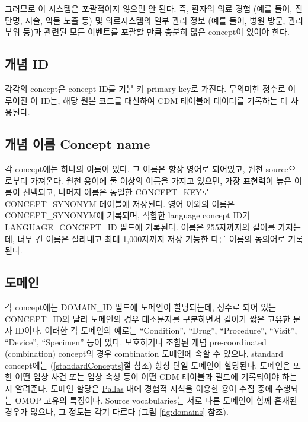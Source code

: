 \documentclass[10.5pt]{book}
\theoremstyle{definition}
\theoremstyle{definition}
\theoremstyle{definition}
\theoremstyle{remark}
\begin{document}
그러므로 이 시스템은 포괄적이지 않으면 안 된다. 즉, 환자의 의료 경험
(예를 들어, 진단명, 시술, 약물 노출 등) 및 의료시스템의 일부 관리 정보
(예를 들어, 병원 방문, 관리 부위 등)과 관련된 모든 이벤트를 포괄할 만큼
충분히 많은 concept이 있어야 한다.

\subsection{개념 ID}\label{-id}

각각의 concept은 concept ID를 기본 키 primary key로 가진다. 무의미한
정수로 이루어진 이 ID는, 해당 원본 코드를 대신하여 CDM 테이블에 데이터를
기록하는 데 사용된다.

\subsection{개념 이름 Concept name}\label{--concept-name}

각 concept에는 하나의 이름이 있다. 그 이름은 항상 영어로 되어있고, 원천
source으로부터 가져온다. 원천 용어에 둘 이상의 이름을 가지고 있으면,
가장 표현력이 높은 이름이 선택되고, 나머지 이름은 동일한 CONCEPT\_KEY로
CONCEPT\_SYNONYM 테이블에 저장된다. 영어 이외의 이름은
CONCEPT\_SYNONYM에 기록되며, 적합한 language concept ID가
LANGUAGE\_CONCEPT\_ID 필드에 기록된다. 이름은 255자까지의 길이를
가지는데, 너무 긴 이름은 잘라내고 최대 1,000자까지 저장 가능한 다른
이름의 동의어로 기록된다.

\subsection{도메인}\label{conceptDomains}

각 concept에는 DOMAIN\_ID 필드에 도메인이 할당되는데, 정수로 되어 있는
CONCEPT\_ID와 달리 도메인의 경우 대소문자를 구분하면서 길이가 짧은
고유한 문자 ID이다. 이러한 각 도메인의 예로는 ``Condition'', ``Drug'',
``Procedure'', ``Visit'', ``Device'', ``Specimen'' 등이 있다. 모호하거나
조합된 개념 pre-coordinated (combination) concept의 경우 combination
도메인에 속할 수 있으나, standard concept에는 (\ref{standardConcepts}절
참조) 항상 단일 도메인이 할당된다. 도메인은 또한 어떤 임상 사건 또는
임상 속성 등이 어떤 CDM 테이블과 필드에 기록되어야 하는지 알려준다.
도메인 할당은 \href{https://github.com/ohDSI/vocabulary-v5.0}{Pallas}
내에 경험적 지식을 이용한 용어 수집 중에 수행되는 OMOP 고유의 특징이다.
Source vocabularies는 서로 다른 도메인이 함께 혼재된 경우가 많으나, 그
정도는 각기 다르다 (그림 \ref{fig:domains} 참조). 
\end{document}
